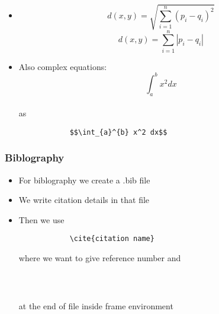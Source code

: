 \documentclass{beamer}
\begin{document}
	\begin{frame}[fragile]
		\begin{Large}
		\begin{itemize}
			\item $$ d(x,y) = \sqrt{\sum_{i=1}^{n} (p_i - q_i)^2} $$					$$ d(x,y) = \sum_{i=1}^{n} |p_i - q_i| $$
			\item Also complex equations:
			$$\int_{a}^{b} x^2 dx$$ \\ as \\
			\begin{verbatim}
			$$\int_{a}^{b} x^2 dx$$
			\end{verbatim}
		\end{itemize}
		\end{Large}
	\end{frame}
	\begin{frame}[fragile]
		\frametitle{Biblography}
		\begin{Large}
		\begin{itemize}
			\item For biblography we create a .bib file
			\item We write citation details in that file
			\item Then we use
			\begin{verbatim}
			\cite{citation name}
			\end{verbatim}
			where we want to give reference number and
			\begin{verbatim}
			
			
			\end{verbatim}
			at the end of file inside frame environment
		\end{itemize}
		\end{Large}
	\end{frame}
\end{document}
